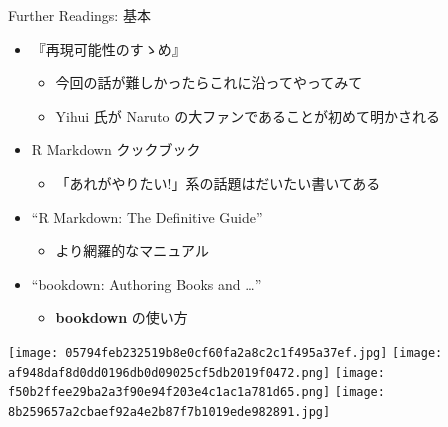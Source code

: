 \documentclass[
  ignorenonframetext,
]{beamer}
\providecommand{\tightlist}{%
  \setlength{\itemsep}{0pt}\setlength{\parskip}{0pt}}
\begin{document}
\begin{frame}{Further Readings: 基本}
\protect\hypertarget{further-readings-ux57faux672c}{}
\begin{itemize}
\tightlist
\item
  『再現可能性のすゝめ』\autocite{Takahashi2018}

  \begin{itemize}
  \tightlist
  \item
    今回の話が難しかったらこれに沿ってやってみて
  \item
    Yihui 氏が Naruto の大ファンであることが初めて明かされる
  \end{itemize}
\item
  R Markdown クックブック\autocite{xie2020Markdowna}

  \begin{itemize}
  \tightlist
  \item
    「あれがやりたい!」系の話題はだいたい書いてある
  \end{itemize}
\item
  ``R Markdown: The Definitive Guide''\autocite{xie2019Markdown}

  \begin{itemize}
  \tightlist
  \item
    より網羅的なマニュアル
  \end{itemize}
\item
  ``bookdown: Authoring Books and \ldots{}''\autocite{xie2017Bookdown}

  \begin{itemize}
  \tightlist
  \item
    \textbf{bookdown} の使い方
  \end{itemize}
\end{itemize}

\begin{center}

\texttt{[image: 05794feb232519b8e0cf60fa2a8c2c1f495a37ef.jpg]}
\texttt{[image: af948daf8d0dd0196db0d09025cf5db2019f0472.png]}
\texttt{[image: f50b2ffee29ba2a3f90e94f203e4c1ac1a781d65.png]}
\texttt{[image: 8b259657a2cbaef92a4e2b87f7b1019ede982891.jpg]}

\end{center}
\end{frame}
\end{document}
